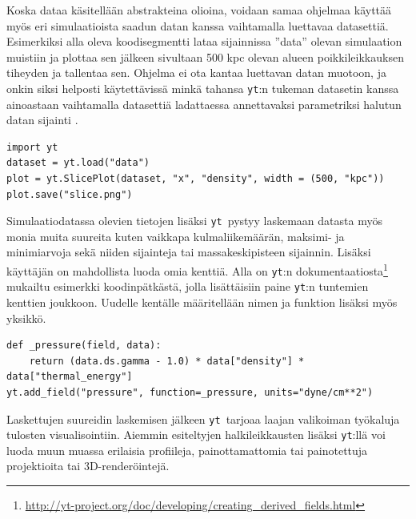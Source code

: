 \documentclass[12pt,a4paper]{article}
\newcommand{\yt}{\texttt{yt}}
\begin{document}
Koska dataa käsitellään abstrakteina olioina, voidaan samaa ohjelmaa käyttää myös eri simulaatioista saadun datan kanssa vaihtamalla luettavaa datasettiä. Esimerkiksi alla oleva koodisegmentti lataa sijainnissa ''data'' olevan simulaation muistiin ja plottaa sen jälkeen sivultaan 500 kpc olevan alueen poikkileikkauksen tiheyden ja tallentaa sen. Ohjelma ei ota kantaa luettavan datan muotoon, ja onkin siksi helposti käytettävissä minkä tahansa \yt :n tukeman datasetin kanssa ainoastaan vaihtamalla datasettiä ladattaessa annettavaksi parametriksi halutun datan sijainti \cite{yt, cookbook}.

\begin{minipage}{\textwidth}
\lstset{style=python}
\begin{lstlisting}
import yt
dataset = yt.load("data")
plot = yt.SlicePlot(dataset, "x", "density", width = (500, "kpc"))
plot.save("slice.png")
\end{lstlisting}
\end{minipage}

Simulaatiodatassa olevien tietojen lisäksi \yt\ pystyy laskemaan datasta myös monia muita suureita kuten vaikkapa kulmaliikemäärän, maksimi- ja minimiarvoja sekä niiden sijainteja tai massakeskipisteen sijainnin. Lisäksi käyttäjän on mahdollista luoda omia kenttiä. Alla on \yt :n dokumentaatiosta\footnote{\url{http://yt-project.org/doc/developing/creating_derived_fields.html}} mukailtu esimerkki koodinpätkästä, jolla lisättäisiin paine \yt :n tuntemien kenttien joukkoon. Uudelle kentälle määritellään nimen ja funktion lisäksi myös yksikkö. \cite{yt, derivedfields}

\begin{minipage}{\textwidth}
\lstset{style=python}
\begin{lstlisting}
def _pressure(field, data):
    return (data.ds.gamma - 1.0) * data["density"] * data["thermal_energy"]
yt.add_field("pressure", function=_pressure, units="dyne/cm**2")
\end{lstlisting}%
\end{minipage}

Laskettujen suureidin laskemisen jälkeen \yt\ tarjoaa laajan valikoiman työkaluja tulosten visualisointiin. Aiemmin esiteltyjen halkileikkausten lisäksi \yt :llä voi luoda muun muassa erilaisia profiileja, painottamattomia tai painotettuja projektioita tai 3D-renderöintejä. \cite{yt}
\end{document}
